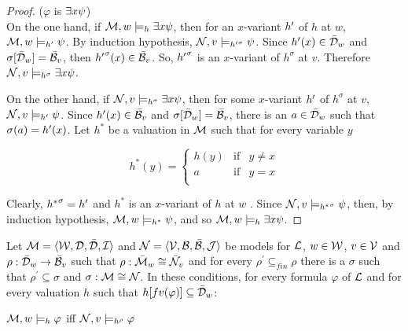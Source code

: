 \begin{proof}
($\varphi$ is $\exists x \psi$)\\

\qquad On the one hand, if $\mathcal{M},w \models_{h} \exists x \psi$, then for an $x$-variant $h^{\prime}$ of $h$ at $w$, $\mathcal{M},w \models_{h^{\prime}} \psi$. By induction hypothesis, $\mathcal{N},v \models_{{h^{\prime}}^{\sigma}}  \psi$. Since $h^{\prime}(x) \in \bar{\mathcal{D}}_{w}$ and $\sigma[\bar{\mathcal{D}}_{w}] = \bar{\mathcal{B}}_{v}$, then ${h^{\prime}}^{\sigma}(x)\in \bar{\mathcal{B}}_{v}$. So, ${h^{\prime}}^{\sigma}$ is an $x$-variant of $h^{\sigma}$ at $v$. Therefore  $\mathcal{N},v \models_{h^{\sigma}} \exists x\psi$.

\qquad On the other hand, if $\mathcal{N},v \models_{h^{\sigma}} \exists x \psi$, then for some $x$-variant $h^{\prime}$ of $h^{\sigma}$ at $v$,  $\mathcal{N},v \models_{h^{\prime}} \psi$. Since $h^{\prime}(x) \in \bar{\mathcal{B}}_{v}$ and $\sigma[\bar{\mathcal{D}}_{w}] = \bar{\mathcal{B}}_{v}$, there is an $a \in \bar{\mathcal{D}}_{w}$ such that $\sigma(a)=h^{\prime}(x)$. Let $h^{*}$ be a valuation in $\mathcal{M}$ such that for every variable $y$



$$
h^{*}(y) = \left\{
\begin{array}{rcl}
h(y) & \mbox{if} & y \neq x\\
a & \mbox{if} & y = x\\
\end{array}
\right.
$$


\qquad Clearly, ${h^{*}}^{\sigma} = h^{\prime}$ and $h^{*}$ is an $x$-variant of $h$ at $w$ . Since $\mathcal{N},v \models_{{h^{*}}^{\sigma}} \psi$, then, by induction hypothesis, $\mathcal{M},w \models_{h^{*}} \psi$, and so $\mathcal{M},w \models_{h} \exists x \psi$. 
\end{proof}

\begin{lema}
Let $\mathcal{M} = \langle\mathcal{W},\mathcal{D}, \bar{\mathcal{D}},\mathcal{I}\rangle$ and $\mathcal{N} = \langle\mathcal{V},\mathcal{B},\bar{\mathcal{B}},\mathcal{J}\rangle$ be models for $\mathcal{L}$, $w \in \mathcal{W}$, $v \in \mathcal{V}$ and $\rho: \bar{\mathcal{D}}_{w} \rightarrow \bar{\mathcal{B}}_{v}$ such that $\rho: \bar{\mathcal{M}}_{w} \cong \bar{\mathcal{N}}_{v}$ and for every $\rho^{\prime} \subseteq_{fin} \rho$ there is a $\sigma$ such that $\rho^{\prime} \subseteq \sigma$ and  $\sigma: \mathcal{M} \cong \mathcal{N}$. In these conditions, for every formula $\varphi$ of $\mathcal{L}$ and for every valuation $h$ such that $h[fv(\varphi)] \subseteq \bar{\mathcal{D}}_{w}$:

\begin{center}
$\mathcal{M},w \models_{h} \varphi$ iff $\mathcal{N},v \models_{h^{\rho}} \varphi$ 
\end{center}
  
\end{lema}

